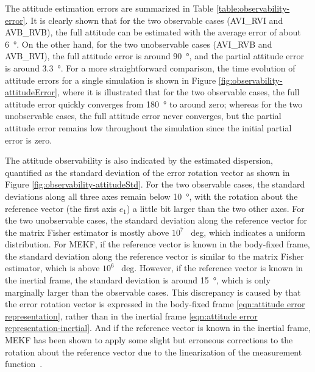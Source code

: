 The attitude estimation errors are summarized in Table \ref{table:observability-error}.
It is clearly shown that for the two observable cases (AVI\_RVI and AVB\_RVB), the full attitude can be estimated with the average error of about \SI{6}{\degree}.
On the other hand, for the two unobservable cases (AVI\_RVB and AVB\_RVI), the full attitude error is around \SI{90}{\degree}, and the partial attitude error is around \SI{3.3}{\degree}.
For a more straightforward comparison, the time evolution of attitude errors for a single simulation is shown in Figure \ref{fig:observability-attitudeError}, where it is illustrated that for the two observable cases, the full attitude error quickly converges from \SI{180}{\degree} to around zero;
whereas for the two unobservable cases, the full attitude error never converges, but the partial attitude error remains low throughout the simulation since the initial partial error is zero.

The attitude observability is also indicated by the estimated dispersion, quantified as the standard deviation of the error rotation vector as shown in Figure \ref{fig:observability-attitudeStd}.
For the two observable cases, the standard deviations along all three axes remain below \SI{10}{\degree}, with the rotation about the reference vector (the first axis $e_1$) a little bit larger than the two other axes.
For the two unobservable cases, the standard deviation along the reference vector for the matrix Fisher estimator is mostly above $10^7$ \SI{}{deg}, which  indicates a uniform distribution.
For MEKF, if the reference vector is known in the body-fixed frame, the standard deviation along the reference vector is similar to the matrix Fisher estimator, which is above $10^6$ \SI{}{deg}.
However, if the reference vector is known in the inertial frame, the standard deviation is around \SI{15}{\degree}, which is only marginally larger than the observable cases.
This discrepancy is caused by that the error rotation vector is expressed in the body-fixed frame \eqref{eqn:attitude error representation}, rather than in the inertial frame \eqref{eqn:attitude error representation-inertial}.
And if the reference vector is known in the inertial frame, MEKF has been shown to apply some slight but erroneous corrections to the rotation about the reference vector due to the linearization of the measurement function~\cite{li2012improving}.


